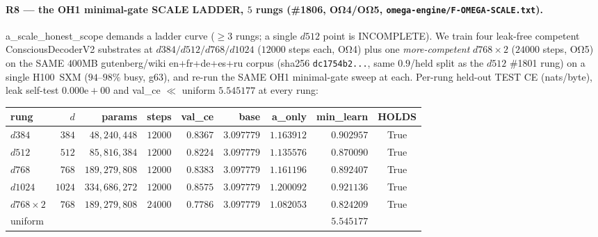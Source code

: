 \documentclass[11pt]{article}
\begin{document}
\paragraph{R8 --- the OH1 minimal-gate SCALE LADDER, $5$ rungs (\#1806, OΩ4/OΩ5,
\texttt{omega-engine/F-OMEGA-SCALE.txt}).} a\_scale\_honest\_scope demands a ladder curve
($\ge3$ rungs; a single $d512$ point is INCOMPLETE). We train four leak-free competent
ConsciousDecoderV2 substrates at $d384/d512/d768/d1024$ ($12000$ steps each, OΩ4) plus one
\emph{more-competent} $d768{\times}2$ ($24000$ steps, OΩ5) on the SAME $400$MB gutenberg/wiki
en+fr+de+es+ru corpus (sha256 \texttt{dc1754b2...}, same $0.9$/held split as the $d512$ \#1801 rung)
on a single H100~SXM ($94$--$98\%$ busy, g63), and re-run the SAME OH1 minimal-gate sweep at each.
Per-rung held-out TEST CE (nats/byte), leak self-test $0.000\mathrm{e}{+}00$ and val\_ce $\ll$
uniform $5.545177$ at every rung:
\begin{tabular}{lrrrrrrrc}
\toprule
rung & $d$ & params & steps & val\_ce & base & a\_only & min\_learn & HOLDS \\
\midrule
$d384$    & $384$  & $48{,}240{,}448$  & $12000$ & $0.8367$ & $3.097779$ & $1.163912$ & $\mathbf{0.902957}$ & True \\
$d512$    & $512$  & $85{,}816{,}384$  & $12000$ & $0.8224$ & $3.097779$ & $1.135576$ & $\mathbf{0.870090}$ & True \\
$d768$    & $768$  & $189{,}279{,}808$ & $12000$ & $0.8383$ & $3.097779$ & $1.161196$ & $\mathbf{0.892407}$ & True \\
$d1024$   & $1024$ & $334{,}686{,}272$ & $12000$ & $0.8575$ & $3.097779$ & $1.200092$ & $\mathbf{0.921136}$ & True \\
$d768{\times}2$ & $768$ & $189{,}279{,}808$ & $24000$ & $\mathbf{0.7786}$ & $3.097779$ & $1.082053$ & $\mathbf{0.824209}$ & True \\
uniform & & & & & & & $5.545177$ & \\
\bottomrule
\end{tabular}\\
\end{document}
